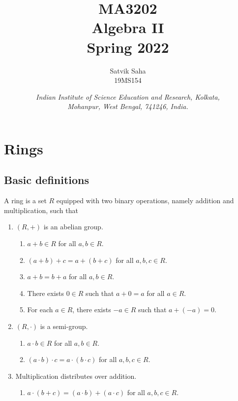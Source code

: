 \documentclass[11pt]{article}
\title{
    \Large\textsc{MA3202} \\
    \Huge \textbf{Algebra II} \\
    \vspace{5pt}
    \Large{Spring 2022}
}
\author{
    \large Satvik Saha
    \\\textsc{\small 19MS154}
}
\date{\normalsize
    \textit{Indian Institute of Science Education and Research, Kolkata, \\
    Mohanpur, West Bengal, 741246, India.} \\
}
\theoremstyle{definition}
\theoremstyle{remark}
\numberwithin{equation}{section}
\begin{document}
    \maketitle

    \tableofcontents
    \clearpage

    \section{Rings}
    
    \subsection{Basic definitions}
    \begin{definition}
        A ring is a set $R$ equipped with two binary operations, namely addition and
        multiplication, such that 
        \begin{enumerate}
            \itemsep0em
            \item $(R, +)$ is an abelian group.
            \begin{enumerate}
                \itemsep0em
                \item $a + b \in R$ for all $a, b \in R$.
                \item $(a + b) + c = a + (b + c)$ for all $a, b, c \in R$.
                \item $a + b = b + a$ for all $a, b \in R$.
                \item There exists $0 \in R$ such that $a + 0 = a$ for all $a \in R$.
                \item For each $a \in R$, there exists $-a \in R$ such that $a + (-a)
                = 0$.
            \end{enumerate}
            \item $(R, \cdot)$ is a semi-group.
            \begin{enumerate}
                \itemsep0em
                \item $a\cdot b \in R$ for all $a, b \in R$.
                \item $(a\cdot b)\cdot c = a\cdot(b\cdot c)$ for all $a, b, c \in R$.
            \end{enumerate}
            \item Multiplication distributes over addition.
            \begin{enumerate}
                \itemsep0em
                \item $a\cdot (b + c) = (a\cdot b) + (a\cdot c)$ for all $a, b, c \in R$.

\end{enumerate}
\end{enumerate}
\end{definition}
\end{document}
